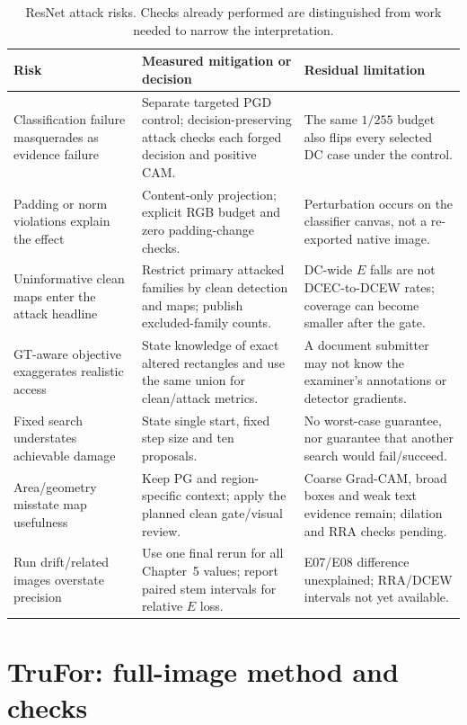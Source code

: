 \begin{table}[htbp]
\centering\footnotesize
\caption{ResNet attack risks. Checks already performed are distinguished from work needed to narrow the interpretation.}
\label{tab:app-adv-resnet-risks}
\begin{tabularx}{\textwidth}{@{}>{\raggedright\arraybackslash}p{}>{\raggedright\arraybackslash}p{}>{\raggedright\arraybackslash}X@{}}
\toprule
Risk & Measured mitigation or decision & Residual limitation \\
\midrule
Classification failure masquerades as evidence failure & Separate targeted PGD control; decision-preserving attack checks each forged decision and positive CAM. & The same $1/255$ budget also flips every selected DC case under the control. \\
Padding or norm violations explain the effect & Content-only projection; explicit RGB budget and zero padding-change checks. & Perturbation occurs on the classifier canvas, not a re-exported native image. \\
Uninformative clean maps enter the attack headline & Restrict primary attacked families by clean detection and maps; publish excluded-family counts. & DC-wide $E$ falls are not DCEC-to-DCEW rates; coverage can become smaller after the gate. \\
GT-aware objective exaggerates realistic access & State knowledge of exact altered rectangles and use the same union for clean/attack metrics. & A document submitter may not know the examiner's annotations or detector gradients. \\
Fixed search understates achievable damage & State single start, fixed step size and ten proposals. & No worst-case guarantee, nor guarantee that another search would fail/succeed. \\
Area/geometry misstate map usefulness & Keep PG and region-specific context; apply the planned clean gate/visual review. & Coarse Grad-CAM, broad boxes and weak text evidence remain; dilation and RRA checks pending. \\
Run drift/related images overstate precision & Use one final rerun for all Chapter~5 values; report paired stem intervals for relative $E$ loss. & E07/E08 difference unexplained; RRA/DCEW intervals not yet available. \\
\bottomrule
\end{tabularx}
\end{table}

\section{TruFor: full-image method and checks}
\label{app:adv-trufor}


